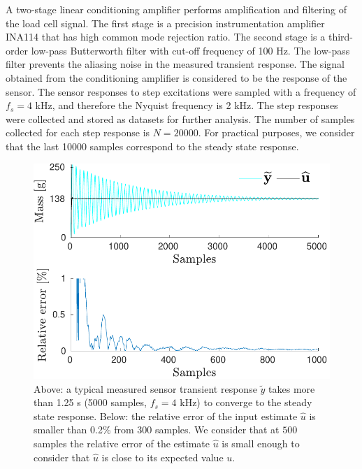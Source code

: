 A two-stage linear conditioning amplifier performs amplification and filtering of the load cell signal.
The first stage is a precision instrumentation amplifier INA114 that has high common mode rejection ratio.
The second stage is a third-order low-pass Butterworth filter with cut-off frequency of 100 Hz.
The low-pass filter prevents the aliasing noise in the measured transient response.
The signal obtained from the conditioning amplifier is considered to be the response of the sensor.
The sensor responses to step excitations were sampled with a frequency of $f_s=4$ kHz, and therefore the Nyquist frequency is 2 kHz.
The step responses were collected and stored as datasets for further analysis.
The number of samples collected for each step response is $N=20000$.
For practical purposes, we consider that the last 10000 samples correspond to the steady state response.
\begin{figure}[!htb]
\centering
\includegraphics[width=1.0\columnwidth]{./ChapterExperimentalValidation/fig/Fig_6.pdf} 
\caption{ \label{fig:uh_exp} 
Above: a typical measured sensor transient response $\widetilde{y}$ takes more than 1.25 s (5000 samples, $f_s = 4$ kHz) to converge to the steady state response. 
Below: the relative error of the input estimate $\widehat{u}$ is smaller than 0.2\% from 300 samples.
We consider that at $500$ samples the relative error of the estimate $\widehat{u}$ is small enough to consider that $\widehat{u}$ is close to its expected value $u$.  }
\end{figure}

